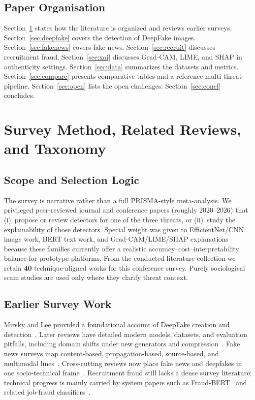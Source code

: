 \documentclass[runningheads]{llncs}
\begin{document}
\subsection{Paper Organisation}
Section~\ref{sec:method} states how the literature is organized and reviews earlier surveys. Section~\ref{sec:deepfake} covers the detection of DeepFake images. Section~\ref{sec:fakenews} covers fake news. Section~\ref{sec:recruit} discusses recruitment fraud. Section~\ref{sec:xai} discusses Grad-CAM, LIME, and SHAP in authenticity settings. Section~\ref{sec:data} summarizes the datasets and metrics. Section~\ref{sec:compare} presents comparative tables and a reference multi-threat pipeline. Section~\ref{sec:open} lists the open challenges. Section~\ref{sec:concl} concludes.

\section{Survey Method, Related Reviews, and Taxonomy}
\label{sec:method}

\subsection{Scope and Selection Logic}
The survey is narrative rather than a full PRISMA-style meta-analysis. We privileged peer-reviewed journal and conference papers (roughly 2020--2026) that (i)~propose or review detectors for one of the three threats, or (ii)~study the explainability of those detectors. Special weight was given to EfficientNet/CNN image work, BERT text work, and Grad-CAM/LIME/SHAP explanations because these families currently offer a realistic accuracy--cost--interpretability balance for prototype platforms. From the conducted literature collection we retain \textbf{40} technique-aligned works for this conference survey. Purely sociological scam studies are used only where they clarify threat context.

\subsection{Earlier Survey Work}
Mirsky and Lee provided a foundational account of DeepFake creation and detection~\cite{r18}. Later reviews have detailed modern models, datasets, and evaluation pitfalls, including domain shifts under new generators and compression~\cite{r08,r09,r20,r23}. Fake news surveys map content-based, propagation-based, source-based, and multimodal lines~\cite{r21,r31,r34}. Cross-cutting reviews now place fake news and deepfakes in one socio-technical frame~\cite{r01}. Recruitment fraud still lacks a dense survey literature; technical progress is mainly carried by system papers such as Fraud-BERT~\cite{r38} and related job-fraud classifiers~\cite{r37}.
\end{document}
